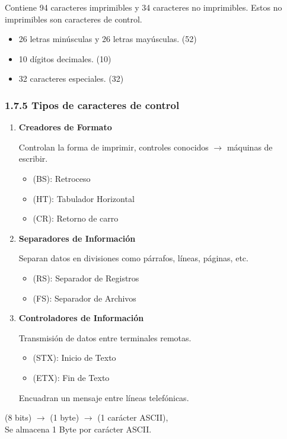 \documentclass{article}
\begin{document}
Contiene 94 caracteres imprimibles y 34 caracteres no imprimibles. Estos no imprimibles son 
caracteres de control.
\begin{itemize}
    \item 26 letras min\'{u}sculas y 26 letras may\'{u}sculas. (52)
    \item 10 d\'{i}gitos decimales. (10)
    \item 32 caracteres especiales. (32)
\end{itemize}
\medbreak

\subsubsection*{1.7.5 Tipos de caracteres de control}

\begin{enumerate}
    \item \textbf{Creadores de Formato}

    Controlan la forma de imprimir, controles conocidos $\rightarrow$ m\'{a}quinas de escribir.
    \begin{itemize}
        \item (BS): Retroceso
        \item (HT): Tabulador Horizontal
        \item (CR): Retorno de carro
    \end{itemize}

    \item \textbf{Separadores de Informaci\'{o}n}

    Separan datos en divisiones como p\'{a}rrafos, l\'{i}neas, p\'{a}ginas, etc.
    \begin{itemize}
        \item (RS): Separador de Registros
        \item (FS): Separador de Archivos
    \end{itemize}

    \item \textbf{Controladores de Informaci\'{o}n}

    Transmisi\'{o}n de datos entre terminales remotas.
    \begin{itemize}
        \item (STX): Inicio de Texto
        \item (ETX): Fin de Texto
    \end{itemize}

    Encuadran un mensaje entre l\'{i}neas telef\'{o}nicas.
\end{enumerate}
(8 bits) $\rightarrow$ (1 byte) $\rightarrow$ (1 car\'{a}cter ASCII), \\
Se almacena 1 Byte por car\'{a}cter ASCII.
\end{document}
